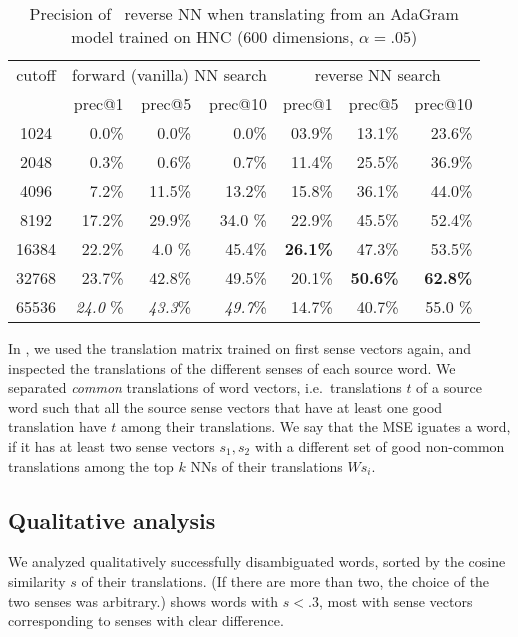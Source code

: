 \documentclass[11pt]{article}
\begin{document}
\begin{table*} \centering
  \begin{tabular}{c|rrr|rrr}
    \toprule
    cutoff &
    \multicolumn{3}{c|}{forward (vanilla) NN search} &
    \multicolumn{3}{c}{reverse NN search} \\
    & prec@1 & prec@5 & prec@10 & prec@1 & prec@5 & prec@10 \\
    \midrule
    1024 & 0.0\% & 0.0\% & 0.0\% & 03.9\% & 13.1\% & 23.6\% \\
    2048 & 0.3\% & 0.6\% & 0.7\% & 11.4\% & 25.5\% & 36.9\% \\
    4096 & 7.2\% & 11.5\% & 13.2\% & 15.8\% & 36.1\% & 44.0\% \\
    8192 & 17.2\% & 29.9\% & 34.0 \%& 22.9\% & 45.5\% & 52.4\% \\
    16384 & 22.2\% & 4.0 \% & 45.4\% & \textbf{26.1\%} & 47.3\% & 53.5\% \\
    32768 & 23.7\% & 42.8\% & 49.5\% & 20.1\% & \textbf{50.6\%} & \textbf{62.8\%} \\
    65536 & \emph{24.0} \%& \emph{43.3}\% & \emph{49.7}\% & 14.7\% & 40.7\% & 55.0 \%\\
    \bottomrule
  \end{tabular}
  \caption{Precision of \any~reverse NN when translating from an AdaGram model
  trained on HNC (600 dimensions, $\alpha=.05$)}
  \label{tab:prec}
\end{table*}

In \disamb, we used the translation matrix trained on first sense vectors again,
and inspected the translations of the different senses of each source word.
We separated \emph{common} translations of word vectors, i.e.~translations $t$ of a source word
such that all the source sense vectors that have at least one good
translation have $t$ among their translations. We say that the MSE
\disamb iguates a word, if it has at least two sense vectors $s_1, s_2$ with a
different set of good non-common translations among the top $k$ NNs of their
translations $Ws_i$.

\subsection{Qualitative analysis}

We analyzed qualitatively successfully disambiguated words, sorted by the
cosine similarity $s$ of their translations.  (If there are more than two, the
choice of the two senses was arbitrary.)  shows words with
$s<.3$, most with sense vectors corresponding to senses with clear difference.
\end{document}

